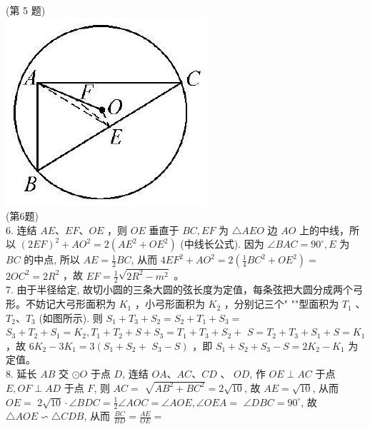 \documentclass[10pt]{article}
\begin{document}
(第 5 题)\\
\includegraphics[max width=\textwidth, center]{2024_10_30_66b8e5e701da2093c133g-088(3)}\\
(第6题)\\
6. 连结 $A E 、 E F 、 O E$ ，则 $O E$ 垂直于 $B C, E F$ 为 $\triangle A E O$ 边 $A O$ 上的中线，所以 $(2 E F)^{2}+A O^{2}=2\left(A E^{2}+O E^{2}\right)$ (中线长公式). 因为 $\angle B A C=90^{\circ}, E$ 为 $B C$ 的中点, 所以 $A E=\frac{1}{2} B C$, 从而 $4 E F^{2}+A O^{2}=2\left(\frac{1}{4} B C^{2}+O E^{2}\right)=$ $2 O C^{2}=2 R^{2}$ ，故 $E F=\frac{1}{2} \sqrt{2 R^{2}-m^{2}}$ 。\\
7. 由于半径给定, 故切小圆的三条大圆的弦长度为定值，每条弦把大圆分成两个弓形。不妨记大弓形面积为 $K_{1}$ ，小弓形面积为 $K_{2}$ ，分别记三个" ""型面积为 $T_{1}$ 、 $T_{2} 、 T_{3}$ (如图所示). 则 $S_{1}+T_{3}+S_{2}=S_{2}+T_{1}+S_{3}=$ $S_{3}+T_{2}+S_{1}=K_{2}, T_{1}+T_{2}+S+S_{3}=T_{1}+T_{3}+S_{2}+$ $S=T_{2}+T_{3}+S_{1}+S=K_{1}$ ，故 $6 K_{2}-3 K_{1}=3\left(S_{1}+S_{2}+\right.$ $\left.S_{3}-S\right)$ ，即 $S_{1}+S_{2}+S_{3}-S=2 K_{2}-K_{1}$ 为定值。\\
8. 延长 $A B$ 交 $\odot O$ 于点 $D$, 连结 $O A 、 A C 、 C D$ 、 $O D$, 作 $O E \perp A C$ 于点 $E, O F \perp A D$ 于点 $F$, 则 $A C=$ $\sqrt{A B^{2}+B C^{2}}=2 \sqrt{10}$, 故 $A E=\sqrt{10}$, 从而 $O E=$ $2 \sqrt{10} \cdot \angle B D C=\frac{1}{2} \angle A O C=\angle A O E, \angle O E A=$ $\angle D B C=90^{\circ}$, 故 $\triangle A O E \backsim \triangle C D B$, 从而 $\frac{B C}{B D}=\frac{A E}{O E}=$\\
\end{document}
